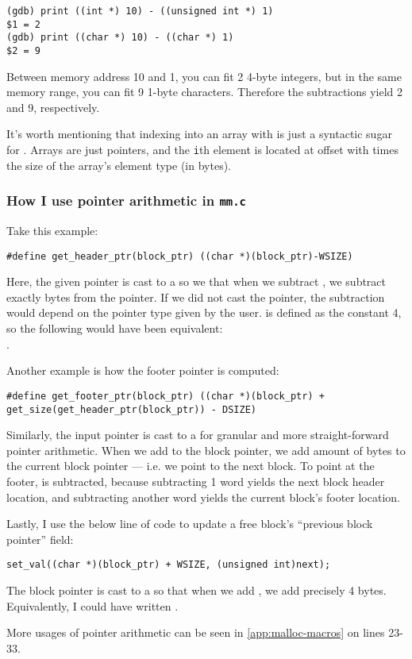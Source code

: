 \begin{verbatim}
(gdb) print ((int *) 10) - ((unsigned int *) 1)
$1 = 2
(gdb) print ((char *) 10) - ((char *) 1)
$2 = 9
\end{verbatim}

Between memory address 10 and 1, you can fit 2 4-byte integers, but in the same memory range, you can fit 9 1-byte characters. Therefore the subtractions yield 2 and 9, respectively.

It's worth mentioning that indexing into an array with  is just a syntactic sugar for . Arrays are just pointers, and the \texttt{i}th element is located at  offset with  times the size of the array's element type (in bytes).

\subsubsection{How I use pointer arithmetic in \texttt{mm.c}}

Take this example:

\begin{verbatim}
#define get_header_ptr(block_ptr) ((char *)(block_ptr)-WSIZE)
\end{verbatim}

Here, the given pointer  is cast to a  so we that when we subtract , we subtract exactly  bytes from the pointer. If we did not cast the pointer, the subtraction would depend on the pointer type given by the user.  is defined as the constant 4, so the following would have been equivalent:\\.

Another example is how the footer pointer is computed:

\begin{verbatim}
#define get_footer_ptr(block_ptr) ((char *)(block_ptr) + get_size(get_header_ptr(block_ptr)) - DSIZE)
\end{verbatim}

Similarly, the input pointer is cast to a  for granular and more straight-forward pointer arithmetic. When we add  to the block pointer, we add  amount of bytes to the current block pointer --- i.e. we point to the next block. To point at the footer,  is subtracted, because subtracting 1 word yields the next block header location, and subtracting another word yields the current block's footer location.

Lastly, I use the below line of code to update a free block's ``previous block pointer'' field:

\begin{verbatim}
set_val((char *)(block_ptr) + WSIZE, (unsigned int)next);
\end{verbatim}

The block pointer is cast to a  so that when we add , we add precisely 4 bytes. Equivalently, I could have written .

More usages of pointer arithmetic can be seen in \autoref{app:malloc-macros} on lines 23-33.
